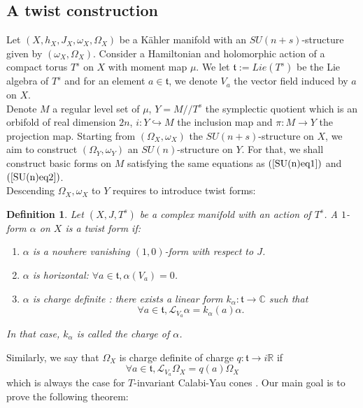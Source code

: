 \documentclass[12pt, reqno]{amsart}
\newtheorem{Defi}{Definition}
\newcommand{\R}{\mathbb{R}}
\newcommand{\C}{\mathbb{C}}
\newcommand{\tor}{\mathfrak{t}}
\newcommand{\lied}{\mathcal{L}}
\begin{document}
\subsection{A twist construction}
\indent Let $(X,h_X,J_X,\omega_X,\Omega_X)$ be a Kähler manifold with an $SU(n+s)$-structure given by $(\omega_X,\Omega_X)$. Consider a Hamiltonian and holomorphic action of a compact torus $T^s$ on $X$ with moment map $\mu$. We let $\tor :=Lie(T^s)$ be the Lie algebra of $T^s$ and for an element $a\in\tor$, we denote $V_a$ the vector field induced by $a$ on $X$. \\ 
\indent Denote $M$ a regular level set of $\mu$, $Y=M/\!\!/T^s$ the symplectic quotient which is an orbifold of real dimension $2n$, $i : Y\hookrightarrow M$ the inclusion map and $\pi : M\to Y$ the projection map. Starting from $(\Omega_X,\omega_X)$ the $SU(n+s)$-structure on $X$, we aim to construct $(\Omega_Y,\omega_Y)$ an $SU(n)$-structure on $Y$. For that, we shall construct basic forms on $M$ satisfying the same equations as $(\ref{SU(n)eq1})$ and $(\ref{SU(n)eq2})$.\\
\indent Descending $\Omega_X,\omega_X$ to $Y$ requires to introduce twist forms:
\begin{Defi}\label{twistformdef}
    Let $(X,J,T^s)$ be a complex manifold with an action of $T^s$. A $1$-form $\alpha$ on $X$ is a twist form if:
    \begin{enumerate}
        \item $\alpha$ is a nowhere vanishing $(1,0)$-form with respect to $J$.
        \item $\alpha$ is horizontal: $\forall a\in\tor,\alpha(V_a)=0$.
        \item $\alpha$ is charge definite : there exists a linear form $k_\alpha : \tor\to\C$ such that \[\forall a\in\tor, \lied_{V_a}\alpha=k_\alpha(a)\alpha.\]
    \end{enumerate}
    In that case, $k_\alpha$ is called the charge of $\alpha$.
\end{Defi}
 Similarly, we say that $\Omega_X$ is charge definite of charge $q:\tor\to i\R$ if
 \[\forall a\in\tor, \lied_{V_a}\Omega_X=q(a)\Omega_X\]which is always the case for $T$-invariant Calabi-Yau cones \cite{Martelli_2008}. Our main goal is to prove the following theorem:
\end{document}

